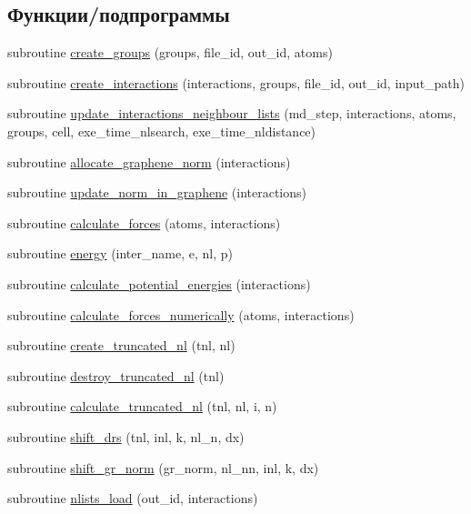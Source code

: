 \subsection*{Функции/подпрограммы}
\begin{DoxyCompactItemize}
\item 
subroutine \mbox{\hyperlink{namespacemd__interactions_a52c7d3a0c8df2f15b75c8fef73ee795d}{create\+\_\+groups}} (groups, file\+\_\+id, out\+\_\+id, atoms)
\item 
subroutine \mbox{\hyperlink{namespacemd__interactions_ad655aab8b55d15d13e66769ae95ca229}{create\+\_\+interactions}} (interactions, groups, file\+\_\+id, out\+\_\+id, input\+\_\+path)
\item 
subroutine \mbox{\hyperlink{namespacemd__interactions_a311e6b53338f1b89611eec1929a6387e}{update\+\_\+interactions\+\_\+neighbour\+\_\+lists}} (md\+\_\+step, interactions, atoms, groups, cell, exe\+\_\+time\+\_\+nlsearch, exe\+\_\+time\+\_\+nldistance)
\item 
subroutine \mbox{\hyperlink{namespacemd__interactions_aba3551fb4bd5364e9cbcfbe81dd6aca9}{allocate\+\_\+graphene\+\_\+norm}} (interactions)
\item 
subroutine \mbox{\hyperlink{namespacemd__interactions_a0f767aead142dc9f1f692172a21a590a}{update\+\_\+norm\+\_\+in\+\_\+graphene}} (interactions)
\item 
subroutine \mbox{\hyperlink{namespacemd__interactions_a851acddc07bbaa6d08cf33c60a9e6822}{calculate\+\_\+forces}} (atoms, interactions)
\item 
subroutine \mbox{\hyperlink{namespacemd__interactions_a5b3213ff25495c56eeabce8427fb3082}{energy}} (inter\+\_\+name, e, nl, p)
\item 
subroutine \mbox{\hyperlink{namespacemd__interactions_a846dbc2db901133c72ff58afb321e918}{calculate\+\_\+potential\+\_\+energies}} (interactions)
\item 
subroutine \mbox{\hyperlink{namespacemd__interactions_a49c070421fed83b68f06a9b8b7f92048}{calculate\+\_\+forces\+\_\+numerically}} (atoms, interactions)
\item 
subroutine \mbox{\hyperlink{namespacemd__interactions_aac3f945d504b95d25098bb5d5d5f4208}{create\+\_\+truncated\+\_\+nl}} (tnl, nl)
\item 
subroutine \mbox{\hyperlink{namespacemd__interactions_a36f14223ced172ec4c9a9bc381384b55}{destroy\+\_\+truncated\+\_\+nl}} (tnl)
\item 
subroutine \mbox{\hyperlink{namespacemd__interactions_abc7ac3a3b1e9382804836d43cdc9a224}{calculate\+\_\+truncated\+\_\+nl}} (tnl, nl, i, n)
\item 
subroutine \mbox{\hyperlink{namespacemd__interactions_a4cbfd0c1d189320866efb63454722170}{shift\+\_\+drs}} (tnl, inl, k, nl\+\_\+n, dx)
\item 
subroutine \mbox{\hyperlink{namespacemd__interactions_a2c4725fefbad36399f5de45a222b5d4e}{shift\+\_\+gr\+\_\+norm}} (gr\+\_\+norm, nl\+\_\+nn, inl, k, dx)
\item 
subroutine \mbox{\hyperlink{namespacemd__interactions_a5787116d9c766f3d3ec6355c299d58c2}{nlists\+\_\+load}} (out\+\_\+id, interactions)
\end{DoxyCompactItemize}



